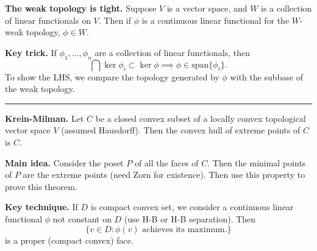 \documentclass[12pt, letterpaper]{article}
\begin{document}
\textbf{The weak topology is tight.} Suppose $V$ is a vector space, and $W$ is a collection of linear functionals on $V$. Then if $\phi$ is a continuous linear functional for the $W$-weak topology, $\phi \in W$.

\textbf{Key trick.} If $\phi_1, \dots, \phi_n$ are a collection of linear functionals, then
\[
    \bigcap \ker \phi_i \subset \ker \phi \implies \phi \in \text{span}\{\phi_i\}.
\]
To show the LHS, we compare the topology generated by $\phi$ with the subbase of the weak topology.

\noindent\rule{\textwidth}{1pt}

\textbf{Krein-Milman.} Let $C$ be a closed convex subset of a locally convex topological vector space $V$ (assumed Hausdorff). Then the convex hull of extreme points of $C$ is $C$.

\textbf{Main idea.} Consider the poset $P$ of all the faces of $C$. Then the minimal points of $P$ are the extreme points (need Zorn for existence). Then use this property to prove this theorem.

\textbf{Key technique.} If $D$ is compact convex set, we consider a continuous linear functional $\phi$ not constant on $D$ (use H-B or H-B separation). Then
\[
    \{v \in D: \phi(v) \text{ achieves its maximum.} \}
\]
is a proper (compact convex) face.
\end{document}
